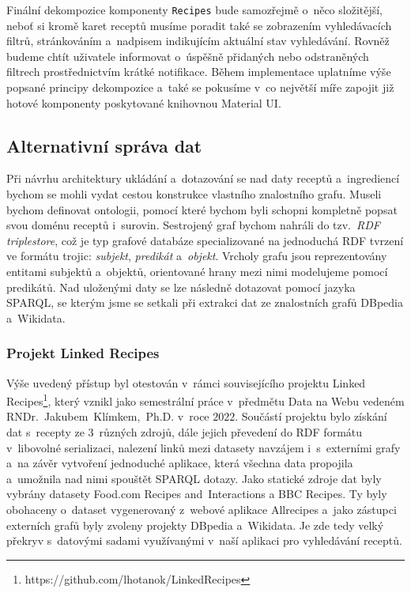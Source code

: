 Finální dekompozice komponenty \texttt{Recipes} bude samozřejmě o~něco složitější, neboť si kromě karet receptů musíme poradit také se zobrazením vyhledávacích filtrů, stránkováním a~nadpisem indikujícím aktuální stav vyhledávání. Rovněž budeme chtít uživatele informovat o~úspěšně přidaných nebo odstraněných filtrech prostřednictvím krátké notifikace. Během implementace uplatníme výše popsané principy dekompozice a~také se pokusíme v~co největší míře zapojit již hotové komponenty poskytované knihovnou Material UI.

\subsection{Alternativní správa dat}

Při návrhu architektury ukládání a~dotazování se nad daty receptů a~ingrediencí bychom se mohli vydat cestou konstrukce vlastního znalostního grafu. Museli bychom definovat ontologii, pomocí které bychom byli schopni kompletně popsat svou doménu receptů i~surovin. Sestrojený graf bychom nahráli do tzv.~\emph{RDF triplestore}, což je typ grafové databáze specializované na jednoduchá RDF tvrzení ve formátu trojic: \emph{subjekt}, \emph{predikát} a~\emph{objekt}. Vrcholy grafu jsou reprezentovány entitami subjektů a~objektů, orientované hrany mezi nimi modelujeme pomocí predikátů. Nad uloženými daty se lze následně dotazovat pomocí jazyka SPARQL, se kterým jsme se setkali při extrakci dat ze znalostních grafů DBpedia a~Wikidata.

\subsubsection{Projekt Linked Recipes}

Výše uvedený přístup byl otestován v~rámci souvisejícího projektu Linked \,Recipes\footnote{https://github.com/lhotanok/LinkedRecipes}, který vznikl jako semestrální práce v~předmětu Data na Webu vedeném RNDr.~Jakubem~Klímkem,~Ph.D. v~roce $2022$. Součástí projektu bylo získání dat s~recepty ze $3$~různých zdrojů, dále jejich převedení do RDF formátu v~libovolné serializaci, nalezení linků mezi datasety navzájem i~s~externími grafy a~na závěr vytvoření jednoduché aplikace, která všechna data propojila a~umožnila nad nimi spouštět SPARQL dotazy. Jako statické zdroje dat byly vybrány datasety Food.com Recipes and~Interactions a BBC Recipes. Ty byly obohaceny o~dataset vygenerovaný z~webové aplikace Allrecipes a~jako zástupci externích grafů byly zvoleny projekty DBpedia a~Wikidata. Je zde tedy velký překryv s~datovými sadami využívanými v~naší aplikaci pro vyhledávání receptů.

